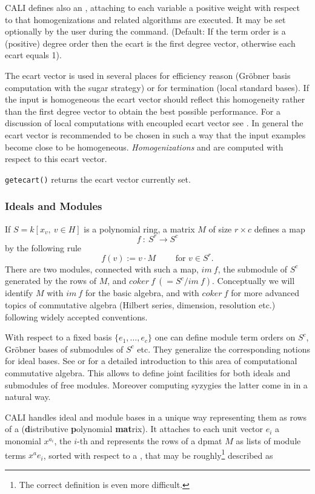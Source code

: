 CALI defines also an , attaching to each variable a
positive weight with respect to that homogenizations and related
algorithms are executed. It may be set optionally by the user during
the  command.  (Default: If the term order is a
(positive) degree order then the ecart is the first degree vector,
otherwise each ecart equals 1).

The ecart vector is used in several places for efficiency reason (Gr\"obner
basis computation with the sugar strategy) or for termination (local
standard bases). If the input is homogeneous the ecart vector should
reflect this homogeneity rather than the first degree vector to
obtain the best possible performance. For a discussion of local
computations with encoupled ecart vector see \cite{Graebe:94}. In general
the ecart vector is recommended to be chosen in such a way that the
input examples become close to be homogeneous. \emph{Homogenizations}
and  are computed with respect to this ecart
vector.
\medskip

\noindent \verb|getecart()| returns the ecart vector
currently set.


\subsubsection{Ideals and Modules}

If $S=k[x_v,\ v \in H]$ is a polynomial ring, a matrix $M$ of size
$r\times c$ defines a map
\[f\ :\ S^r \longrightarrow S^c\]
by the following rule
\[ f(v):=v\cdot M \qquad \mbox{ for } v \in S^r.\]
There are two modules, connected with such a map, $im\ f$, the
submodule of $S^c$ generated by the rows of $M$, and $coker\ f\
(=S^c/im\ f)$. Conceptually we will identify $M$ with $im\ f$ for the
basic algebra, and with $coker\ f$ for more advanced topics of
commutative algebra (Hilbert series, dimension, resolution etc.)
following widely accepted conventions.

With respect to a fixed basis $\{e_1,\ldots ,e_c\}$ one can define
module term orders on $S^c$, Gr\"obner bases of submodules of $S^c$ etc.
They generalize the corresponding notions for ideal bases. See
\cite{Eisenbud:95} or \cite{MoellerMora:86} for a detailed introduction to this area of
computational commutative algebra. This allows to define joint
facilities for both ideals and submodules of free modules. Moreover
computing syzygies the latter come in in a natural way.

CALI handles ideal and module bases in a unique way representing them
as rows of a \ind{dpmat} (\textbf{d}istributive \textbf{p}olynomial \textbf{mat}rix). 
It attaches to each unit vector $e_i$ a monomial $x^{a_i}$,
the $i$-th  and represents the rows of a dpmat $M$
as lists of module terms $x^ae_i$, sorted with respect to a
, that may be roughly\footnote{The correct
definition is even more difficult.} described as 
\bigskip

